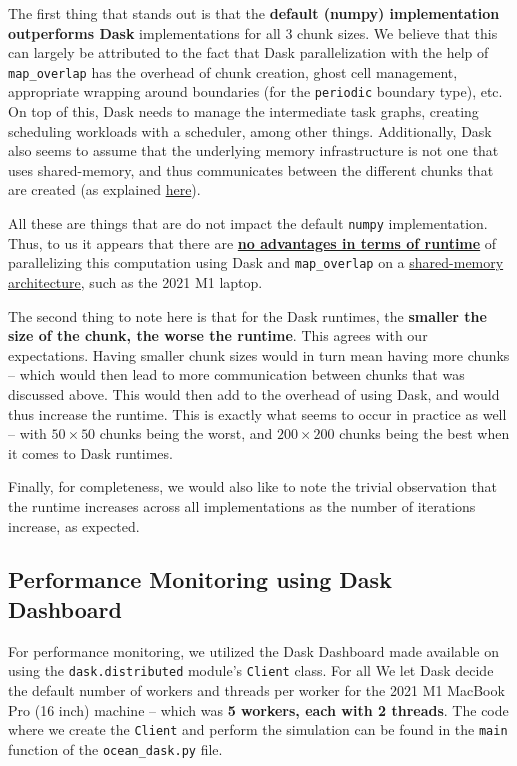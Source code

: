 \documentclass[a4paper,12pt]{article}
\begin{document}
The first thing that stands out is that the \textbf{default (numpy) implementation outperforms Dask} implementations for all 3 chunk sizes. We believe that this can largely be attributed to the fact that Dask parallelization with the help of \verb|map_overlap| has the overhead of chunk creation, ghost cell management, appropriate wrapping around boundaries (for the \verb|periodic| boundary type), etc. On top of this, Dask needs to manage the intermediate task graphs, creating scheduling workloads with a scheduler, among other things. Additionally, Dask also seems to assume that the underlying memory infrastructure is not one that uses shared-memory, and thus communicates between the different chunks that are created (as explained \href{https://canvas.kth.se/courses/52247/discussion_topics/452810}{here}). 

All these are things that are do not impact the default \verb|numpy| implementation. Thus, to us it appears that there are \textbf{\underline{no advantages in terms of runtime}} of parallelizing this computation using Dask and \verb|map_overlap| on a \underline{shared-memory architecture}, such as the 2021 M1 laptop. 

The second thing to note here is that for the Dask runtimes, the \textbf{smaller the size of the chunk, the worse the runtime}. This agrees with our expectations. Having smaller chunk sizes would in turn mean having more chunks -- which would then lead to more communication between chunks that was discussed above. This would then add to the overhead of using Dask, and would thus increase the runtime. This is exactly what seems to occur in practice as well -- with $50 \times 50$ chunks being the worst, and $200 \times 200$ chunks being the best when it comes to Dask runtimes. 

Finally, for completeness, we would also like to note the trivial observation that the runtime increases across all implementations as the number of iterations increase, as expected. 

\subsection{Performance Monitoring using Dask Dashboard}
For performance monitoring, we utilized the Dask Dashboard made available on using the \verb|dask.distributed| module's \verb|Client| class. For all We let Dask decide the default number of workers and threads per worker for the 2021 M1 MacBook Pro (16 inch) machine -- which was \textbf{5 workers, each with 2 threads}. The code where we create the \verb|Client| and perform the simulation can be found in the \verb|main| function of the \verb|ocean_dask.py| file.
\end{document}
